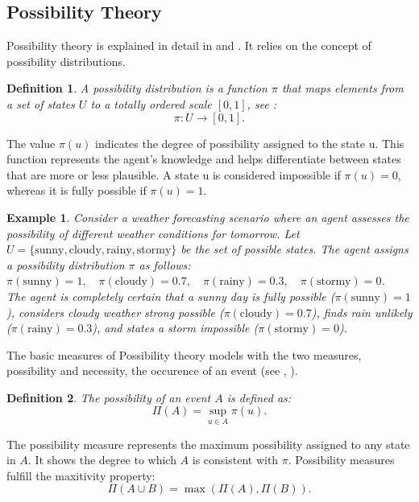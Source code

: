 \documentclass[seminar,english,m]{AIGpaper}
\newtheorem{definition}{Definition}
\newtheorem{example}{Example}
\begin{document}
\subsection{Possibility Theory}
Possibility theory is explained in detail in \cite{dubois2023possibility} and \cite{zadeh1978}. It relies on the concept of possibility distributions.
\begin{definition}
	A possibility distribution is a function \( \pi \) that maps elements from a set of states \( U \) to a totally ordered scale \( \left[ 0 , 1 \right]  \), see \cite{dubois2014possibilistic}:
	\[
	\pi: U \to \left[ 0 , 1 \right] .
	\]
\end{definition}
The value $ \pi(u) $ indicates the degree of possibility assigned to the state u. This function represents the agent’s knowledge and helps differentiate between states that are more or less plausible. A state u is considered impossible if $ \pi(u) = 0 $, whereas it is fully possible if $ \pi(u) = 1 $.
\begin{example}
	Consider a weather forecasting scenario where an agent assesses the possibility of different weather conditions for tomorrow. Let $ U = \{\text{sunny}, \text{cloudy}, \text{rainy}, \text{stormy}\} $ be the set of possible states. The agent assigns a possibility distribution $ \pi $ as follows: \\
	$ \pi(\text{sunny}) = 1, \quad \pi(\text{cloudy}) = 0.7, \quad \pi(\text{rainy}) = 0.3, \quad \pi(\text{stormy}) = 0$. \\
	The agent is completely certain that a sunny day is fully possible ($\pi(\text{sunny}) = 1$), considers cloudy weather strong possible ($\pi(\text{cloudy}) = 0.7$), finds rain unlikely ($\pi(\text{rainy}) = 0.3$), and states a storm impossible ($\pi(\text{stormy}) = 0$).
\end{example}
The basic measures of Possibility theory models with the two measures, possibility and necessity, the occurence of an event (see \cite{dubois2014possibilistic}, \cite{lang2000possibilistic}).
\begin{definition}  
	The possibility of an event \( A \) is defined as:  
	\[
	\Pi(A) = \sup_{u \in A} \pi \left( u \right).
	\]  
\end{definition}  
The possibility measure represents the maximum possibility assigned to any state in \( A \). It shows the degree to which \( A \) is consistent with \( \pi \). Possibility measures fulfill the maxitivity property:
\[
\Pi \left( A \cup B \right)  = \max \left( \Pi \left( A \right), \Pi \left(  B \right) \right).
\]  
\end{document}
